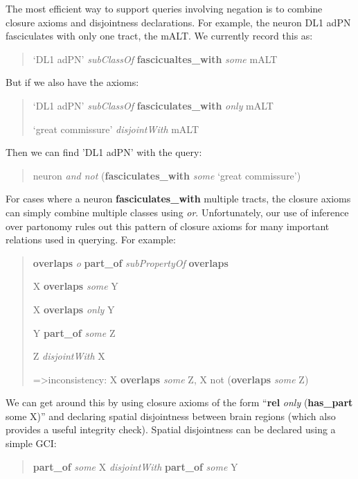 \documentclass[runningheads,a4paper]{llncs}
\begin{document}
The most efficient way to support queries involving negation is to
combine closure axioms and disjointness declarations.  For
example, the neuron DL1 adPN fasciculates with only one tract, the
mALT.  We currently record this as:


\begin{quote}
`DL1 adPN' \textit{subClassOf} \textbf{fascicualtes\_with} \textit{some} mALT
\end{quote}

But if we also have the axioms:

\begin{quote}
`DL1 adPN' \textit{subClassOf} \textbf{fasciculates\_with} \textit{only} mALT

`great commissure' \textit{disjointWith} mALT
\end{quote}

Then we can find 'DL1 adPN' with the query:
\begin{quote}
	neuron \textit{and not} (\textbf{fasciculates\_with} \textit{some} `great commissure')
\end{quote}

For cases where a neuron \textbf{fasciculates\_with} multiple tracts, the
closure axioms can simply combine multiple classes using
\textit{or}. Unfortunately, our use of inference over partonomy rules out
this pattern of closure axioms for many important relations used in querying.  For example:

\begin{quote}
\textbf{overlaps} \textit{o} \textbf{part\_of} \textit{subPropertyOf}
\textbf{overlaps}

X \textbf{overlaps} \textit{some} Y

X \textbf{overlaps} \textit{only} Y

Y \textbf{part\_of} \textit{some} Z

Z \textit{disjointWith} X

=\textgreater inconsistency: X \textbf{overlaps} \textit{some} Z, X not (\textbf{overlaps}
\textit{some} Z)
\end{quote}


We can get around this by using closure axioms of the form
``\textbf{rel} \textit{only} (\textbf{has\_part} some X)'' and declaring spatial
disjointness between brain regions (which also provides a useful
integrity check). Spatial disjointness can be declared using a simple
GCI:

\begin{quote}
\textbf{part\_of} \textit{some} X \textit{disjointWith} \textbf{part\_of} \textit{some} Y
\end{quote}
\end{document}
